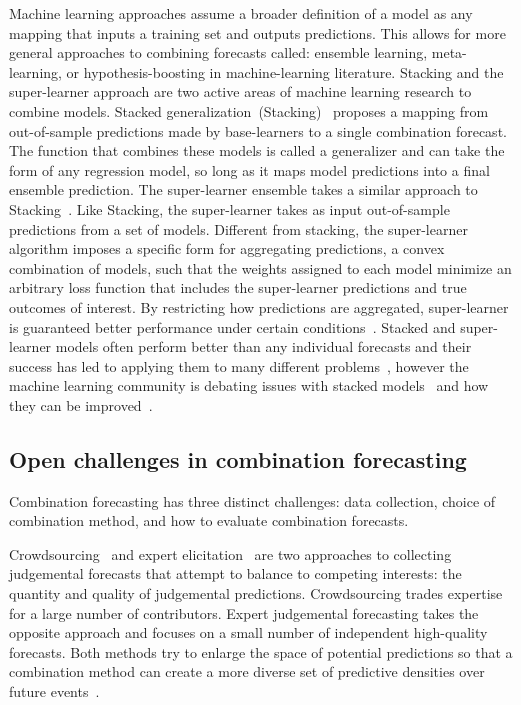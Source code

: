 \documentclass[preprint]{elsarticle}
\begin{document}
Machine learning approaches assume a broader definition of a model as any mapping that inputs a training set and outputs predictions.
This allows for more general approaches to combining forecasts called: ensemble learning, meta-learning, or hypothesis-boosting in machine-learning literature.
Stacking and the super-learner approach are two active areas of machine learning research to combine models.
%
Stacked generalization~(Stacking)~\cite{wolpert1992stacked} proposes a mapping from out-of-sample predictions made by base-learners to a single combination forecast.
The function that combines these models is called a generalizer and can take the form of any regression model, so long as it maps model predictions into a final ensemble prediction.
The super-learner ensemble takes a similar approach to Stacking~\cite{van2007super,polley2010super}. 
Like Stacking, the super-learner takes as input out-of-sample predictions from a set of models.
Different from stacking, the super-learner algorithm imposes a specific form for aggregating predictions, a convex combination of models, such that the weights assigned to each model minimize an arbitrary loss function that includes the super-learner predictions and true outcomes of interest.
By restricting how predictions are aggregated, super-learner is guaranteed better performance under certain conditions~\cite{van2007super,polley2010super}. 
%
Stacked and super-learner models often perform better than any individual forecasts and their success has led to applying them to many different problems~\cite{syarif2012application,sakkis2001stacking,che2011decision,wang2011comparative}, however the machine learning community is debating issues with stacked models~\cite{ting1999issues} and how they can be improved~\cite{dvzeroski2004combining}. 

\subsection{Open challenges in combination forecasting}
Combination forecasting has three distinct challenges: data collection, choice of combination method, and how to evaluate combination forecasts.

Crowdsourcing~\cite{howe2006rise,brabham2013crowdsourcing,abernethy2011collaborative,forlines2014crowdsourcing,moran2016epidemic} and expert elicitation~\cite{amara1971some,yousuf2007using,o2006uncertain} are two approaches to collecting judgemental forecasts that attempt to balance to competing interests: the quantity and quality of judgemental predictions.
Crowdsourcing trades expertise for a large number of contributors.
Expert judgemental forecasting takes the opposite approach and focuses on a small number of independent high-quality forecasts. 
Both methods try to enlarge the space of potential predictions so that a combination method can create a more diverse set of predictive densities over future events~\cite{dietterich2002ensemble,bates1969combination}.
\end{document}
